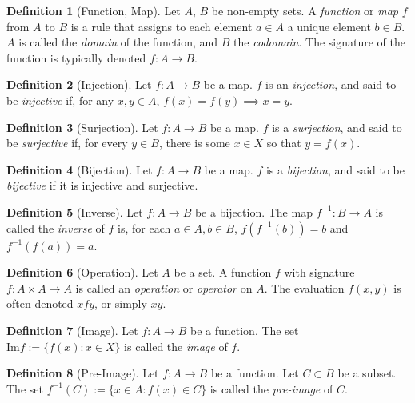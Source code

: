 \documentclass{article}
\theoremstyle{definition}
\newtheorem{definition}{Definition}[subsection]
\begin{document}
\begin{definition}[Function, Map]
    Let $A$, $B$ be non-empty sets. A \textit{function} or \textit{map} $f$ from $A$ to $B$ is a rule that assigns to each element $a\in A$ a unique element $b\in B$. $A$ is called the \textit{domain} of the function, and $B$ the \textit{codomain}. The signature of the function is typically denoted $f:A\rightarrow B$.
\end{definition}
\begin{definition}[Injection]
    Let $f:A\rightarrow B$ be a map. $f$ is an \textit{injection}, and said to be \textit{injective} if, for any $x,y\in A$, $f(x)=f(y)\implies x=y$.
\end{definition}
\begin{definition}[Surjection]
    Let $f:A\rightarrow B$ be a map. $f$ is a \textit{surjection}, and said to be \textit{surjective} if, for every $y\in B$, there is some $x\in X$ so that $y=f(x)$.
\end{definition}
\begin{definition}[Bijection]
    Let $f:A\rightarrow B$ be a map. $f$ is a \textit{bijection}, and said to be \textit{bijective} if it is injective and surjective.
\end{definition}
\begin{definition}[Inverse]
    Let $f:A\rightarrow B$ be a bijection. The map $f^{-1}:B\rightarrow A$ is called the \textit{inverse} of $f$ is, for each $a\in A, b\in B$, $f(f^{-1}(b))=b$ and $f^{-1}(f(a))=a$.    
\end{definition}
\begin{definition}[Operation]
    Let $A$ be a set. A function $f$ with signature $f:A\times A \rightarrow A$ is called an \textit{operation} or \textit{operator} on $A$. The evaluation $f(x,y)$ is often denoted $xfy$, or simply $xy$.
\end{definition}


\begin{definition}[Image]
    Let $f:A\rightarrow B$ be a function. The set $\text{Im} f:=\{f(x): x\in X\}$ is called the \textit{image} of $f$.
\end{definition}
\begin{definition}[Pre-Image]
    Let $f:A\rightarrow B$ be a function. Let $C\subset B$ be a subset. The set $f^{-1}(C):=\{x\in A : f(x)\in C\}$ is called the \textit{pre-image} of $C$.
\end{definition}
\end{document}
